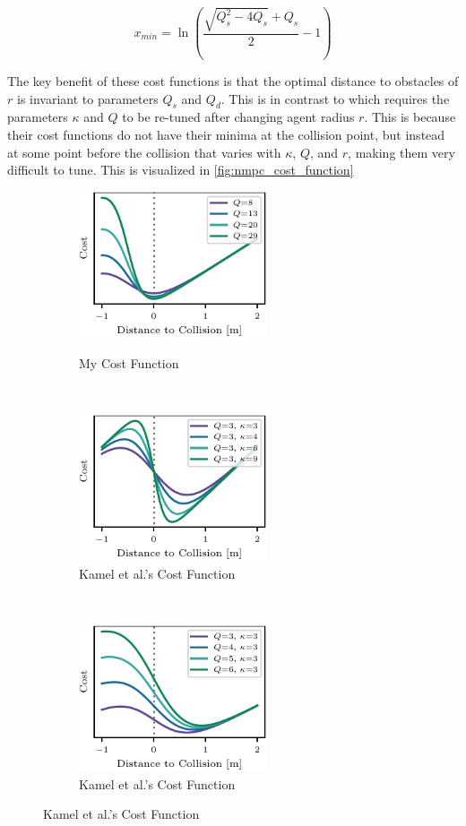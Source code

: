 \begin{equation} \label{eq:x-min}
    x_{min} = \ln \left( \frac{\sqrt{Q_s^2-4Q_s}+Q_s}{2}-1 \right)
\end{equation}

The key benefit of these cost functions is that the optimal distance to obstacles of $r$ is invariant to parameters $Q_s$ and $Q_d$. This is in contrast to \autocite{DBLP:journals/corr/KamelASN17} which requires the parameters $\kappa$ and $Q$ to be re-tuned after changing agent radius $r$. This is because their cost functions do not have their minima at the collision point, but instead at some point before the collision that varies with $\kappa$, $Q$, and $r$, making them very difficult to tune. This is visualized in \autoref{fig:nmpc_cost_function}

\begin{figure}[h]
    \centering

    \begin{subfigure}[t]{0.33\textwidth}
        \centering
        \caption{My Cost Function}
        \includegraphics[height=1.7in]{figures/nmpc_cost_function_0.pdf}
        \label{fig:nmpc_cost_function-a}
    \end{subfigure}%
    ~
    \begin{subfigure}[t]{0.33\textwidth}
        \centering
        \caption{Kamel et al.'s Cost Function}
        \includegraphics[height=1.7in]{figures/nmpc_cost_function_1.pdf}
    \end{subfigure}%
    ~
    \begin{subfigure}[t]{0.33\textwidth}
        \centering
        \caption{Kamel et al.'s Cost Function}
        \includegraphics[height=1.7in]{figures/nmpc_cost_function_2.pdf}
    \end{subfigure}%


\end{figure}
